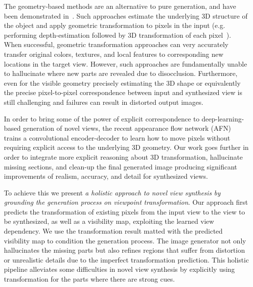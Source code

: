 \documentclass[10pt,twocolumn,letterpaper]{article}
\begin{document}
The geometry-based methods are an alternative to pure generation, and have been demonstrated in~\cite{hoiem_togs2005,OM3D2014,rematas2016novel}. Such approaches estimate the underlying 3D structure of the object and apply geometric transformation to pixels in the input (e.g. performing depth-estimation followed by 3D transformation of each pixel~\cite{garg_eccv2016}).  When successful, geometric transformation approaches can very accurately transfer original colors, textures, and local features to corresponding new locations in the target view. However, such approaches are fundamentally unable to hallucinate where new parts are revealed due to disocclusion. Furthermore, even for the visible geometry precisely estimating the 3D shape or equivalently the precise pixel-to-pixel correspondence between input and synthesized view is still challenging and failures can result in distorted output images.

In order to bring some of the power of explicit correspondence to deep-learning-based generation of novel views, the recent appearance flow network (AFN)~\cite{Zhou_eccv2016} trains a convolutional encoder-decoder to learn how to move pixels without requiring explicit access to the underlying 3D geometry. Our work goes further in order to integrate more explicit reasoning about 3D transformation, hallucinate missing sections, and clean-up the final generated image producing significant improvements of realism, accuracy, and detail for synthesized views.

To achieve this we present \emph{a holistic approach to novel view synthesis by grounding the generation process on viewpoint transformation}. Our approach first predicts the transformation of existing pixels from the input view to the view to be synthesized, as well as a visibility map, exploiting the learned view dependency. We use the transformation result matted with the predicted visibility map to condition the generation process. The image generator not only hallucinates the missing parts but also refines regions that suffer from distortion or unrealistic details due to the imperfect transformation prediction. This holistic pipeline alleviates some difficulties in novel view synthesis by explicitly using transformation for the parts where there are strong cues.  %
\end{document}
